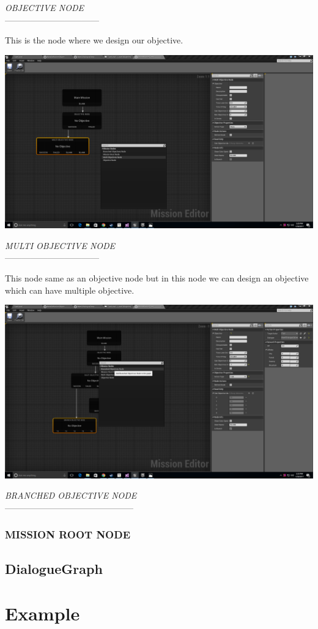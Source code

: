 \documentclass[12pt]{article}
\begin{document}
	  \begin{center}
	  \textit{OBJECTIVE NODE}\\
	  \----------------------------------
	  \end{center}
	  This is the node where we design our objective.
	   \begin{center}
	  \includegraphics[scale=0.2]{MultiObjectiveNode.png}
	  \end{center}
	  \begin{center}
	  \textit{MULTI OBJECTIVE NODE}\\
	  \----------------------------------
	  \end{center}
	  This node same as an objective node but in this node we can design an objective which can have multiple objective.
	   \begin{center}
	  \includegraphics[scale=0.2]{BranchedObjectiveNode.png}
	  \end{center}
	  \begin{center}
	  \textit{BRANCHED OBJECTIVE NODE}\\
	  \----------------------------------------------
	  \end{center}
	  \subsubsection{MISSION ROOT NODE}
	  \subsection{DialogueGraph}
	  \section{Example}
\end{document}
